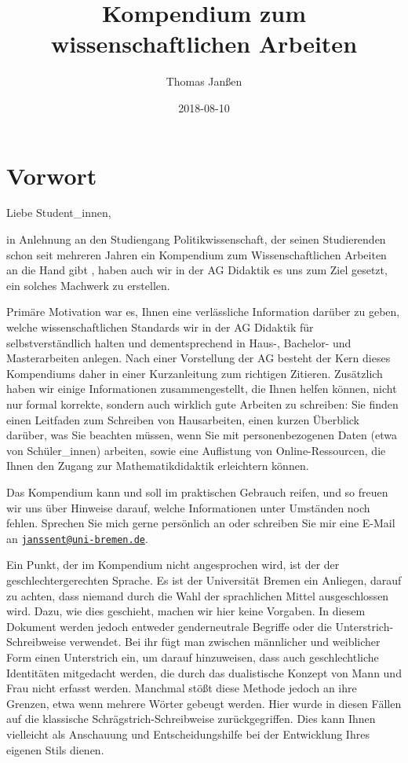 \documentclass[ngerman,oneside,12pt,a4paper]{scrbook}
\title{Kompendium zum wissenschaftlichen Arbeiten}
\author{Thomas Janßen}
\date{2018-08-10}
\begin{document}
\maketitle

{
\setcounter{tocdepth}{1}
\tableofcontents
}
\chapter*{Vorwort}\label{vorwort}

Liebe Student\_innen,

in Anlehnung an den Studiengang Politikwissenschaft, der seinen
Studierenden schon seit mehreren Jahren ein Kompendium zum
Wissenschaftlichen Arbeiten an die Hand gibt
\autocite{autorengruppe2012}, haben auch wir in der AG Didaktik es uns
zum Ziel gesetzt, ein solches Machwerk zu erstellen.

Primäre Motivation war es, Ihnen eine verlässliche Information darüber
zu geben, welche wissenschaftlichen Standards wir in der AG Didaktik für
selbstverständlich halten und dementsprechend in Haus-, Bachelor- und
Masterarbeiten anlegen. Nach einer Vorstellung der AG besteht der Kern
dieses Kompendiums daher in einer Kurzanleitung zum richtigen Zitieren.
Zusätzlich haben wir einige Informationen zusammengestellt, die Ihnen
helfen können, nicht nur formal korrekte, sondern auch wirklich gute
Arbeiten zu schreiben: Sie finden einen Leitfaden zum Schreiben von
Hausarbeiten, einen kurzen Überblick darüber, was Sie beachten müssen,
wenn Sie mit personenbezogenen Daten (etwa von Schüler\_innen) arbeiten,
sowie eine Auflistung von Online-Ressourcen, die Ihnen den Zugang zur
Mathematikdidaktik erleichtern können.

Das Kompendium kann und soll im praktischen Gebrauch reifen, und so
freuen wir uns über Hinweise darauf, welche Informationen unter
Umständen noch fehlen. Sprechen Sie mich gerne persönlich an oder
schreiben Sie mir eine E-Mail an
\href{mailto:janssent@uni-bremen.de}{\nolinkurl{janssent@uni-bremen.de}}.

Ein Punkt, der im Kompendium nicht angesprochen wird, ist der der
geschlechtergerechten Sprache. Es ist der Universität Bremen ein
Anliegen, darauf zu achten, dass niemand durch die Wahl der sprachlichen
Mittel ausgeschlossen wird. Dazu, wie dies geschieht, machen wir hier
keine Vorgaben. In diesem Dokument werden jedoch entweder genderneutrale
Begriffe oder die Unterstrich-Schreibweise verwendet. Bei ihr fügt man
zwischen männlicher und weiblicher Form einen Unterstrich ein, um darauf
hinzuweisen, dass auch geschlechtliche Identitäten mitgedacht werden,
die durch das dualistische Konzept von Mann und Frau nicht erfasst
werden. Manchmal stößt diese Methode jedoch an ihre Grenzen, etwa wenn
mehrere Wörter gebeugt werden. Hier wurde in diesen Fällen auf die
klassische Schrägstrich-Schreibweise zurückgegriffen. Dies kann Ihnen
vielleicht als Anschauung und Entscheidungshilfe bei der Entwicklung
Ihres eigenen Stils dienen.
\end{document}
